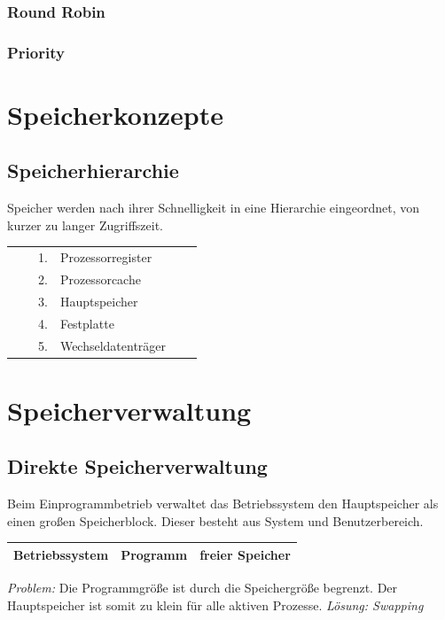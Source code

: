 \documentclass[12pt,a4paper]{article}
\begin{document}
\subsubsection{Round Robin}

\subsubsection{Priority}

\section{Speicherkonzepte}

\subsection{Speicherhierarchie}
    Speicher werden nach ihrer Schnelligkeit in eine Hierarchie eingeordnet, von kurzer zu langer Zugriffszeit.
	\begin{center}
		\begin{tabularx}{13cm}{XXXlXX}
			&&1.& Prozessorregister&&\\
			&&2.& Prozessorcache&&\\
			&&3.& Hauptspeicher&&\\
			&&4.& Festplatte&&\\
			&&5.& Wechseldatenträger&&\\
		\end{tabularx}
	\end{center}

\section{Speicherverwaltung}

\subsection{Direkte Speicherverwaltung}
    Beim Einprogrammbetrieb verwaltet das Betriebssystem den Hauptspeicher als einen großen Speicherblock. Dieser besteht aus System und Benutzerbereich.
    \begin{center}
        \begin{tabularx}{13cm}{|X|X|X|}
            \hline
            Betriebssystem&Programm&freier Speicher \\
            \hline
        \end{tabularx}
    \end{center}
    \textit{Problem:}\newline
    Die Programmgröße ist durch die Speichergröße begrenzt. Der Hauptspeicher ist somit zu klein für alle aktiven Prozesse.\newline
    \textit{Lösung: Swapping}
\end{document}
